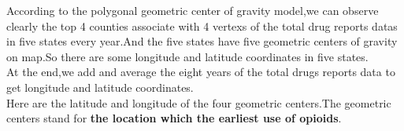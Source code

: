 \documentclass{mcmthesis}
\begin{document}
\noindent According to the polygonal geometric center of gravity model,we can observe clearly the top 4 counties associate with 4 vertexs of the total drug reports datas in five states every year.And the five states have five geometric centers of gravity on map.So there are some longitude and latitude coordinates in five states.\\
\noindent At the end,we add and average the eight years of the total drugs reports data to get longitude and latitude coordinates.\\

\noindent Here are the latitude and longitude of the four geometric centers.The geometric centers stand for \textbf{the location which the earliest use of opioids}.\\
\end{document}
